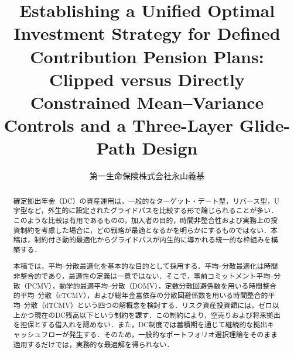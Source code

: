 \documentclass[10pt,a4paper]{article}
\title{Establishing a Unified Optimal Investment Strategy for Defined Contribution Pension Plans:\\
\large Clipped versus Directly Constrained Mean--Variance Controls and a Three-Layer Glide-Path Design}
\author{第一生命保険株式会社\quad 永山義基}
\theoremstyle{plain}
\theoremstyle{definition}
\begin{document}
\maketitle
\begin{abstract}
\begin{sloppypar}
確定拠出年金（DC）の資産運用は，一般的なターゲット・デート型，リバース型，U字型など，外生的に設定されたグライドパスを比較する形で論じられることが多い．このような比較は有用であるものの，加入者の目的，時間非整合性および実務上の投資制約を考慮した場合に，どの戦略が最適となるかを明らかにするものではない．本稿は，制約付き動的最適化からグライドパスが内生的に導かれる統一的な枠組みを構築する．

本稿では，平均--分散最適化を基本的な目的として採用する．平均--分散最適化は時間非整合的であり，最適性の定義は一意ではない．そこで，事前コミットメント平均--分散（PCMV），動学的最適平均--分散（DOMV），定数分散回避係数を用いる時間整合的平均--分散（cTCMV），および総年金富依存の分散回避係数を用いる時間整合的平均--分散（dTCMV）という四つの解概念を検討する．リスク資産投資額には，ゼロ以上かつ現在のDC残高以下という制約を課す．この制約により，空売りおよび将来拠出を担保とする借入れを認めない．また，DC制度では蓄積期を通じて継続的な拠出キャッシュフローが発生する．そのため，一般的なポートフォリオ選択理論をそのまま適用するだけでは，実務的な最適解を得られない．


\end{sloppypar}
\end{abstract}
\end{document}
